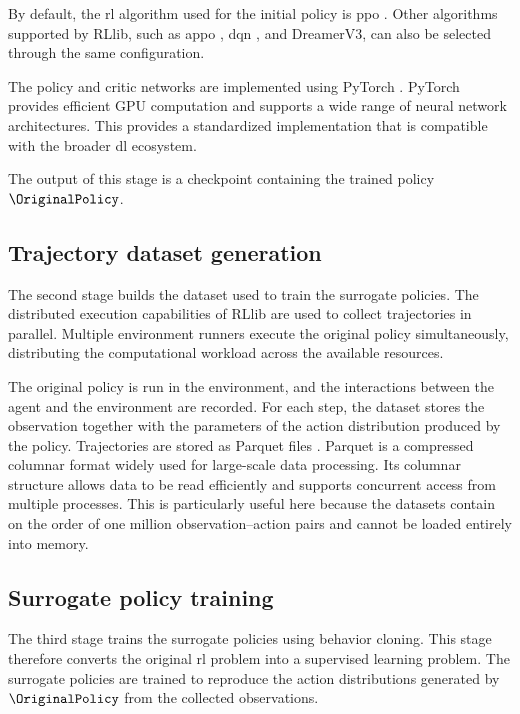 By default, the \gls{rl} algorithm used for the initial policy is \gls{ppo} \cite{schulman2017proximalpolicyoptimizationalgorithms}.
Other algorithms supported by RLlib, such as \gls{appo} \cite{espeholt2018impala}, \gls{dqn} \cite{mnih2013playingatarideepreinforcement}, and DreamerV3, can also be selected through the same configuration.

The policy and critic networks are implemented using PyTorch \cite{paszke2019pytorch}.
PyTorch provides efficient GPU computation and supports a wide range of neural network architectures.
This provides a standardized implementation that is compatible with the broader \gls{dl} ecosystem.

The output of this stage is a checkpoint containing the trained policy $\OriginalPolicy$.

\subsection{Trajectory dataset generation}

The second stage builds the dataset used to train the surrogate policies.
The distributed execution capabilities of RLlib are used to collect trajectories in parallel.
Multiple environment runners execute the original policy simultaneously, distributing the computational workload across the available resources.

The original policy is run in the environment, and the interactions between the agent and the environment are recorded.
For each step, the dataset stores the observation together with the parameters of the action distribution produced by the policy.
Trajectories are stored as Parquet files \cite{arrow}.
Parquet is a compressed columnar format widely used for large-scale data processing.
Its columnar structure allows data to be read efficiently and supports concurrent access from multiple processes.
This is particularly useful here because the datasets contain on the order of one million observation--action pairs and cannot be loaded entirely into memory.

\subsection{Surrogate policy training}

The third stage trains the surrogate policies using behavior cloning.
This stage therefore converts the original \gls{rl} problem into a supervised learning problem.
The surrogate policies are trained to reproduce the action distributions generated by $\OriginalPolicy$ from the collected observations.

